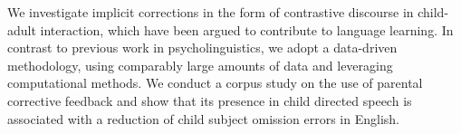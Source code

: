 We investigate implicit corrections in the form of contrastive discourse in child-adult interaction, which have been argued to contribute to language learning. In contrast to previous work in psycholinguistics, we adopt a data-driven methodology, using comparably large amounts of data and  leveraging computational methods. We conduct a corpus study on the use of parental corrective feedback and show that its presence in child directed speech is associated with a reduction of child subject omission errors in English.

